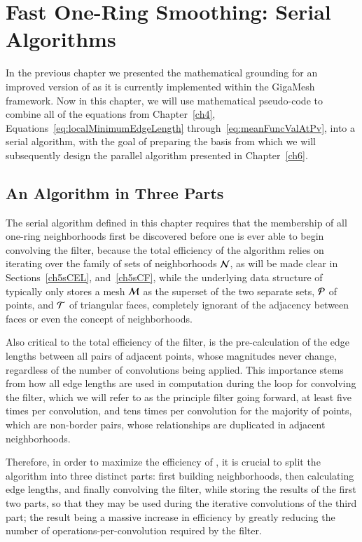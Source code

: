 \chapter{Fast One-Ring Smoothing: Serial Algorithms}
\label{ch5}
In the previous chapter we presented the mathematical grounding for an improved version of  as it is currently implemented within the GigaMesh framework. Now in this chapter, we will use mathematical pseudo-code to combine all of the equations from Chapter~\ref{ch4}, Equations~\ref{eq:localMinimumEdgeLength} through~\ref{eq:meanFuncValAtPv}, into a serial algorithm, with the goal of preparing the basis from which we will subsequently design the parallel algorithm presented in Chapter~\ref{ch6}.

%
%
%
%
\section{An Algorithm in Three Parts}
\label{ch5sATP}
The serial algorithm defined in this chapter requires that the membership of all one-ring neighborhoods first be discovered before one is ever able to begin convolving the filter, because the total efficiency of the algorithm relies on iterating over the family of sets of neighborhoods $\mathcal{N}$, as will be made clear in Sections~\ref{ch5sCEL}, and~\ref{ch5sCF}, while the underlying data structure of \tdd{} typically only stores a mesh $\mathcal{M}$ as the superset of the two separate sets, $\mathcal{P}$ of points, and $\mathcal{T}$ of triangular faces, completely ignorant of the adjacency between faces or even the concept of neighborhoods. 

Also critical to the total efficiency of the filter, is the pre-calculation of the edge lengths between all pairs of adjacent points, whose magnitudes never change, regardless of the number of convolutions being applied. This importance stems from how all edge lengths are used in computation during the loop for convolving the filter, which we will refer to as the principle filter going forward, at least five times per convolution, and tens times per convolution for the majority of points, which are non-border pairs, whose relationships are duplicated in adjacent neighborhoods.%
%

Therefore, in order to maximize the efficiency of , it is crucial to split the algorithm into three distinct parts: first building neighborhoods, then calculating edge lengths, and finally convolving the filter, while storing the results of the first two parts, so that they may be used during the iterative convolutions of the third part; the result being a massive increase in efficiency by greatly reducing the number of operations-per-convolution required by the filter.

